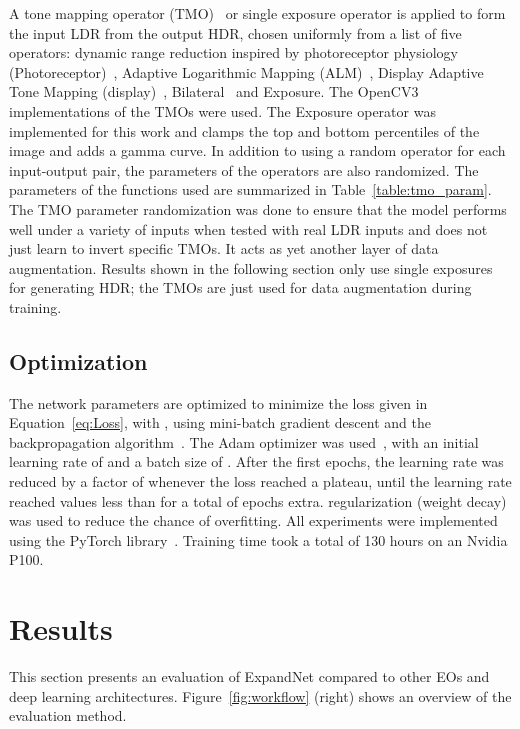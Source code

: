 \documentclass{egpubl}
\begin{document}
A tone mapping operator (TMO)~\cite{tumblin1993tonemap} or single exposure operator is applied to form the input LDR from the output HDR, chosen
uniformly from a list of five operators: dynamic range reduction inspired by photoreceptor physiology (Photoreceptor)~\cite{reinhard2005dynamic},
Adaptive Logarithmic Mapping (ALM)~\cite{drago2003tmo}, Display Adaptive Tone Mapping (display)~\cite{mantiuk08display},
Bilateral~\cite{durand2002tmo} and Exposure. The OpenCV3 implementations of the TMOs were used. The Exposure operator was implemented for this work
and clamps the top and bottom percentiles of the image and adds a gamma curve. In addition to using a random operator for each input-output pair, the
parameters of the operators are also randomized. The parameters of the functions used are summarized in Table~\ref{table:tmo_param}. The TMO
parameter randomization was done to ensure that the model performs well under a variety of inputs when tested with real LDR inputs and does not just
learn to invert specific TMOs. It acts as yet another layer of data augmentation. Results shown in the following section only use single exposures
for generating HDR; the TMOs are just used for data augmentation during training.


\subsection{\textbf{Optimization}}

The network parameters are optimized to minimize the loss given in
Equation~\ref{eq:Loss}, with , using mini-batch gradient descent and
the backpropagation algorithm~\cite{rumelhart1986learning}. The Adam optimizer
was used~\cite{kingma2014adam}, with an initial learning rate of  and a
batch size of . After the first  epochs, the learning rate was
reduced by a factor of  whenever the loss reached a plateau, until the
learning rate reached values less than  for a total of  epochs
extra.  regularization (weight decay) was used to reduce the chance of
overfitting. All experiments were implemented using the PyTorch
library~\cite{pytorch}. Training time took a total of 130 hours on an Nvidia
P100.


\section{\textbf{Results}}
\label{sec:results}

This section presents an evaluation of ExpandNet compared to other EOs and deep
learning architectures. Figure~\ref{fig:workflow} (right) shows an overview of
the evaluation method.
\end{document}
